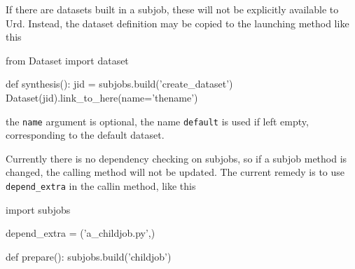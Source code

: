 If there are datasets built in a subjob, these will not be explicitly
available to Urd.  Instead, the dataset definition may be copied to
the launching method like this
\begin{python}
from Dataset import dataset

def synthesis():
  jid = subjobs.build('create_dataset')
  Dataset(jid).link_to_here(name='thename')
\end{python}
the \texttt{name} argument is optional, the name \texttt{default} is
used if left empty, corresponding to the default dataset.

Currently there is no dependency checking on subjobs, so if a subjob
method is changed, the calling method will not be updated.  The
current remedy is to use \texttt{depend\_extra} in the callin method,
like this
\begin{python}
import subjobs

depend_extra = ('a_childjob.py',)

def prepare():
  subjobs.build('childjob')
\end{python}
